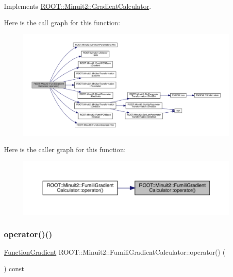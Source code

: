Implements \mbox{\hyperlink{classROOT_1_1Minuit2_1_1GradientCalculator_a1bae913e96ffc9ece28664a5f6f79cb0}{R\+O\+O\+T\+::\+Minuit2\+::\+Gradient\+Calculator}}.

Here is the call graph for this function\+:\nopagebreak
\begin{figure}[H]
\begin{center}
\leavevmode
\includegraphics[width=350pt]{d8/de6/classROOT_1_1Minuit2_1_1FumiliGradientCalculator_a23fd61bceabbf88e66c5abe6b2815331_cgraph}
\end{center}
\end{figure}
Here is the caller graph for this function\+:\nopagebreak
\begin{figure}[H]
\begin{center}
\leavevmode
\includegraphics[width=350pt]{d8/de6/classROOT_1_1Minuit2_1_1FumiliGradientCalculator_a23fd61bceabbf88e66c5abe6b2815331_icgraph}
\end{center}
\end{figure}
\mbox{\label{classROOT_1_1Minuit2_1_1FumiliGradientCalculator_a23fd61bceabbf88e66c5abe6b2815331}} 
\subsubsection{\texorpdfstring{operator()()}{operator()()}\hspace{0.1cm}{\footnotesize\ttfamily [2/4]}}
{\footnotesize\ttfamily \mbox{\hyperlink{classROOT_1_1Minuit2_1_1FunctionGradient}{Function\+Gradient}} R\+O\+O\+T\+::\+Minuit2\+::\+Fumili\+Gradient\+Calculator\+::operator() (\begin{DoxyParamCaption}\item[{const \mbox{\hyperlink{classROOT_1_1Minuit2_1_1MinimumParameters}{Minimum\+Parameters}} \&}]{ }\end{DoxyParamCaption}) const\hspace{0.3cm}{\ttfamily [virtual]}}



